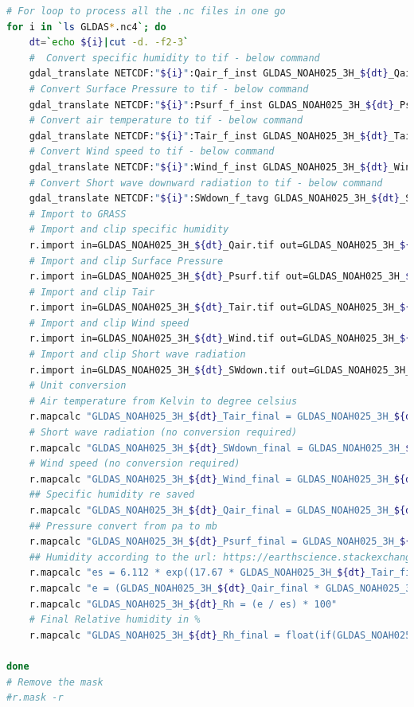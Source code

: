 \begin{lstlisting}[language=Bash]
# For loop to process all the .nc files in one go
for i in `ls GLDAS*.nc4`; do
    dt=`echo ${i}|cut -d. -f2-3`
    #  Convert specific humidity to tif - below command
    gdal_translate NETCDF:"${i}":Qair_f_inst GLDAS_NOAH025_3H_${dt}_Qair.tif
    # Convert Surface Pressure to tif - below command
    gdal_translate NETCDF:"${i}":Psurf_f_inst GLDAS_NOAH025_3H_${dt}_Psurf.tif
    # Convert air temperature to tif - below command
    gdal_translate NETCDF:"${i}":Tair_f_inst GLDAS_NOAH025_3H_${dt}_Tair.tif
    # Convert Wind speed to tif - below command
    gdal_translate NETCDF:"${i}":Wind_f_inst GLDAS_NOAH025_3H_${dt}_Wind.tif
    # Convert Short wave downward radiation to tif - below command
    gdal_translate NETCDF:"${i}":SWdown_f_tavg GLDAS_NOAH025_3H_${dt}_SWdown.tif
    # Import to GRASS
    # Import and clip specific humidity
    r.import in=GLDAS_NOAH025_3H_${dt}_Qair.tif out=GLDAS_NOAH025_3H_${dt}_Qair -o
    # Import and clip Surface Pressure
    r.import in=GLDAS_NOAH025_3H_${dt}_Psurf.tif out=GLDAS_NOAH025_3H_${dt}_Psurf -o
    # Import and clip Tair
    r.import in=GLDAS_NOAH025_3H_${dt}_Tair.tif out=GLDAS_NOAH025_3H_${dt}_Tair -o
    # Import and clip Wind speed
    r.import in=GLDAS_NOAH025_3H_${dt}_Wind.tif out=GLDAS_NOAH025_3H_${dt}_Wind -o
    # Import and clip Short wave radiation
    r.import in=GLDAS_NOAH025_3H_${dt}_SWdown.tif out=GLDAS_NOAH025_3H_${dt}_SWdown -o
    # Unit conversion
    # Air temperature from Kelvin to degree celsius
    r.mapcalc "GLDAS_NOAH025_3H_${dt}_Tair_final = GLDAS_NOAH025_3H_${dt}_Tair - 273.15"
    # Short wave radiation (no conversion required)
    r.mapcalc "GLDAS_NOAH025_3H_${dt}_SWdown_final = GLDAS_NOAH025_3H_${dt}_SWdown"
    # Wind speed (no conversion required)
    r.mapcalc "GLDAS_NOAH025_3H_${dt}_Wind_final = GLDAS_NOAH025_3H_${dt}_Wind"
    ## Specific humidity re saved
    r.mapcalc "GLDAS_NOAH025_3H_${dt}_Qair_final = GLDAS_NOAH025_3H_${dt}_Qair"
    ## Pressure convert from pa to mb
    r.mapcalc "GLDAS_NOAH025_3H_${dt}_Psurf_final = GLDAS_NOAH025_3H_${dt}_Psurf / 100"
    ## Humidity according to the url: https://earthscience.stackexchange.com/questions/2360/how-do-i-convert-specific-humidity-to-relative-humidity
    r.mapcalc "es = 6.112 * exp((17.67 * GLDAS_NOAH025_3H_${dt}_Tair_final) / (GLDAS_NOAH025_3H_${dt}_Tair_final + 243.5))"
    r.mapcalc "e = (GLDAS_NOAH025_3H_${dt}_Qair_final * GLDAS_NOAH025_3H_${dt}_Psurf_final) / (0.378 * GLDAS_NOAH025_3H_${dt}_Qair_final + 0.622)"
    r.mapcalc "GLDAS_NOAH025_3H_${dt}_Rh = (e / es) * 100"
    # Final Relative humidity in %
    r.mapcalc "GLDAS_NOAH025_3H_${dt}_Rh_final = float(if(GLDAS_NOAH025_3H_${dt}_Rh > 100, 100, if(GLDAS_NOAH025_3H_${dt}_Rh < 0, 0, GLDAS_NOAH025_3H_${dt}_Rh)))"

done
# Remove the mask
#r.mask -r
\end{lstlisting}
